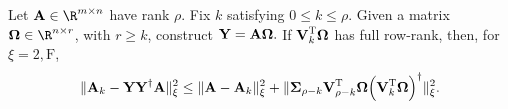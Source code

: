 \begin{lemma}
\label{prop:structural-result2}
Let $\matA \in \R^{m \times n}$ have rank $\rho.$ Fix $k$ satisfying $0 \leq k \leq \rho$.
Given a matrix $\matOmega \in \R^{n \times r}$, with $r \ge k$, construct ${\bm{\mathrm{Y}}} = {\bm{\mathrm{A}}} {\bm{\mathrm{\Omega}}}.$
If ${\bm{\mathrm{V}}}_k ^{\textsc{T}} {\bm{\mathrm{\Omega}}}$ has full row-rank, then,
for $\xi=2, \mathrm{F}$,
\begin{equation}
\label{eqn:tropp-structural-result2a}
\XNormS{\matA_k - \matY \pinv{\matY} \matA} \leq  \XNormS{\matA - \matA_k} +
\XNormS{\matSig_{\rho - k} \matV_{\rho-k} \transp \matOmega \pinv{\left( \matV_k \transp \matOmega \right)} }.
\end{equation}
\end{lemma}
